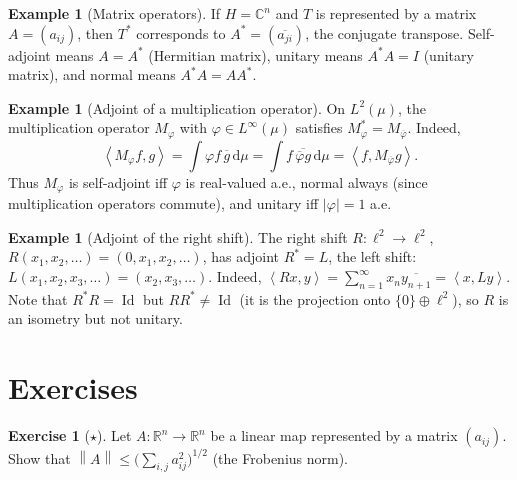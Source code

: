 \documentclass[a4paper,12pt]{book}
\DeclareMathOperator{\Id}{Id}
\newcommand{\R}{\mathbb{R}}
\newcommand{\C}{\mathbb{C}}
\newcommand{\dd}{\mathrm{d}}
\newcommand{\norm}[1]{\left\| #1 \right\|}
\newcommand{\abs}[1]{\left| #1 \right|}
\newcommand{\inner}[2]{\left\langle #1, #2 \right\rangle}
\theoremstyle{definition}
\newtheorem{example}[definition]{Example}
\newtheorem{exercise}{Exercise}[chapter]
\theoremstyle{plain}
\theoremstyle{remark}
\begin{document}
\begin{example}[Matrix operators]\label{ex:adjoint-matrix}
If $H=\C^n$ and $T$ is represented by a matrix $A=(a_{ij})$, then $T^*$
corresponds to $A^*=(\overline{a_{ji}})$, the conjugate transpose. Self-adjoint
means $A=A^*$ (Hermitian matrix), unitary means $A^*A=I$ (unitary matrix), and
normal means $A^*A=AA^*$.
\end{example}

\begin{example}[Adjoint of a multiplication operator]\label{ex:adjoint-mult}
On $L^2(\mu)$, the multiplication operator $M_\varphi$ with $\varphi\in L^\infty(\mu)$
satisfies $M_\varphi^* = M_{\overline{\varphi}}$. Indeed,
\[
  \inner{M_\varphi f}{g} = \int \varphi f\,\overline{g}\,\dd\mu
  = \int f\,\overline{\overline{\varphi}g}\,\dd\mu = \inner{f}{M_{\overline{\varphi}}g}.
\]
Thus $M_\varphi$ is self-adjoint iff $\varphi$ is real-valued a.e., normal always
(since multiplication operators commute), and unitary iff $\abs{\varphi}=1$ a.e.
\end{example}

\begin{example}[Adjoint of the right shift]\label{ex:adjoint-shift}
The right shift $R\colon\ell^2\to\ell^2$, $R(x_1,x_2,\dots)=(0,x_1,x_2,\dots)$,
has adjoint $R^*=L$, the left shift: $L(x_1,x_2,x_3,\dots)=(x_2,x_3,\dots)$.
Indeed, $\inner{Rx}{y}=\sum_{n=1}^\infty x_n\overline{y_{n+1}}=\inner{x}{Ly}$.
Note that $R^*R=\Id$ but $RR^*\neq\Id$ (it is the projection onto $\{0\}\oplus\ell^2$),
so $R$ is an isometry but not unitary.
\end{example}

\section{Exercises}

\begin{exercise}[$\star$]\label{exo:op-norm-matrix}
Let $A\colon\R^n\to\R^n$ be a linear map represented by a matrix $(a_{ij})$.
Show that $\norm{A}\leq\bigl(\sum_{i,j}a_{ij}^2\bigr)^{1/2}$ (the Frobenius
norm).
\end{exercise}
\end{document}
